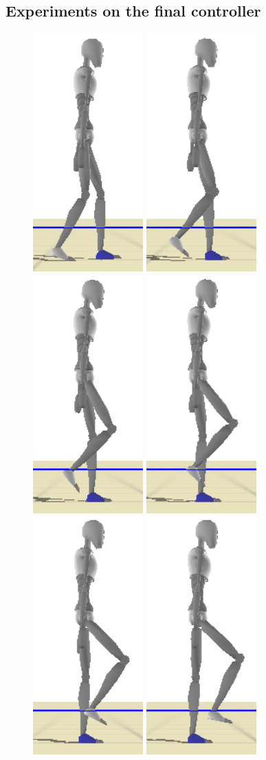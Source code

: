 \documentclass[runningheads,a4paper,10pt]{llncs}
\begin{document}
\subsection{Experiments on the final controller}
\begin{figure}[t]
\centering
\begin{minipage}{0.4\columnwidth}
\includegraphics[width=0.101\columnwidth]{images/strips/0_25/1.png}
\includegraphics[width=0.101\columnwidth]{images/strips/0_25/2.png}
\includegraphics[width=0.101\columnwidth]{images/strips/0_25/3.png}
\includegraphics[width=0.101\columnwidth]{images/strips/0_25/4.png}
\includegraphics[width=0.101\columnwidth]{images/strips/0_25/5.png}
\includegraphics[width=0.101\columnwidth]{images/strips/0_25/6.png}

\end{minipage}
\end{figure}
\end{document}
